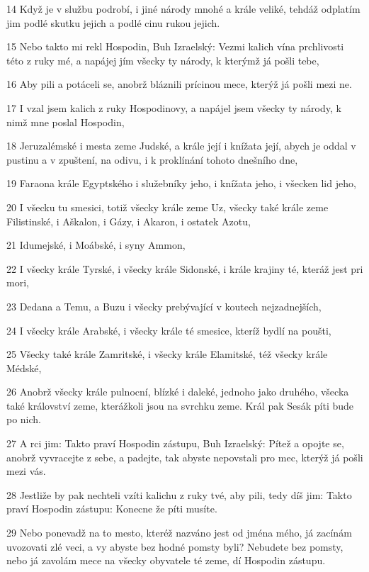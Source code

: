 \par 14 Když je v službu podrobí, i jiné národy mnohé a krále veliké, tehdáž odplatím jim podlé skutku jejich a podlé cinu rukou jejich.
\par 15 Nebo takto mi rekl Hospodin, Buh Izraelský: Vezmi kalich vína prchlivosti této z ruky mé, a napájej jím všecky ty národy, k kterýmž já pošli tebe,
\par 16 Aby pili a potáceli se, anobrž bláznili prícinou mece, kterýž já pošli mezi ne.
\par 17 I vzal jsem kalich z ruky Hospodinovy, a napájel jsem všecky ty národy, k nimž mne poslal Hospodin,
\par 18 Jeruzalémské i mesta zeme Judské, a krále její i knížata její, abych je oddal v pustinu a v zpuštení, na odivu, i k proklínání tohoto dnešního dne,
\par 19 Faraona krále Egyptského i služebníky jeho, i knížata jeho, i všecken lid jeho,
\par 20 I všecku tu smesici, totiž všecky krále zeme Uz, všecky také krále zeme Filistinské, i Aškalon, i Gázy, i Akaron, i ostatek Azotu,
\par 21 Idumejské, i Moábské, i syny Ammon,
\par 22 I všecky krále Tyrské, i všecky krále Sidonské, i krále krajiny té, kteráž jest pri mori,
\par 23 Dedana a Temu, a Buzu i všecky prebývající v koutech nejzadnejších,
\par 24 I všecky krále Arabské, i všecky krále té smesice, kteríž bydlí na poušti,
\par 25 Všecky také krále Zamritské, i všecky krále Elamitské, též všecky krále Médské,
\par 26 Anobrž všecky krále pulnocní, blízké i daleké, jednoho jako druhého, všecka také království zeme, kterážkoli jsou na svrchku zeme. Král pak Sesák píti bude po nich.
\par 27 A rci jim: Takto praví Hospodin zástupu, Buh Izraelský: Pítež a opojte se, anobrž vyvracejte z sebe, a padejte, tak abyste nepovstali pro mec, kterýž já pošli mezi vás.
\par 28 Jestliže by pak nechteli vzíti kalichu z ruky tvé, aby pili, tedy díš jim: Takto praví Hospodin zástupu: Konecne že píti musíte.
\par 29 Nebo ponevadž na to mesto, kteréž nazváno jest od jména mého, já zacínám uvozovati zlé veci, a vy abyste bez hodné pomsty byli? Nebudete bez pomsty, nebo já zavolám mece na všecky obyvatele té zeme, dí Hospodin zástupu.
